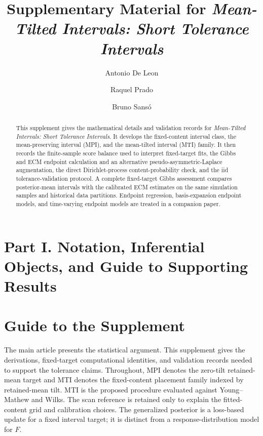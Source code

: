 \documentclass[11pt]{article}
\title{Supplementary Material for \emph{Mean-Tilted Intervals:
Short Tolerance Intervals}}
\author{Antonio De Leon \and Raquel Prado \and Bruno Sans\'o}
\date{}
\begin{document}
\maketitle

\begin{abstract}
\noindent
This supplement gives the mathematical details and validation records for
\emph{Mean-Tilted Intervals: Short Tolerance Intervals}. It develops the
fixed-content interval class, the mean-preserving interval (MPI), and the
mean-tilted interval (MTI) family. It then records the finite-sample score
balance used to interpret fixed-target fits, the Gibbs and ECM endpoint
calculation and an alternative pseudo-asymmetric-Laplace augmentation, the direct
Dirichlet-process content-probability check, and the iid tolerance-validation
protocol. A complete fixed-target Gibbs assessment compares posterior-mean
intervals with the calibrated ECM estimates on the same simulation samples
and historical data partitions. Endpoint regression, basis-expansion endpoint
models, and time-varying endpoint models are treated in a companion paper.
\end{abstract}

\section*{Part I. Notation, Inferential Objects, and Guide to Supporting Results}

\section{Guide to the Supplement}
\label{sec:supp-guide}

The main article presents the statistical argument. This supplement gives the
derivations, fixed-target computational identities, and validation
records needed to support the tolerance claims. Throughout, MPI denotes the
zero-tilt retained-mean target and MTI denotes the fixed-content placement
family indexed by retained-mean tilt. MTI is the proposed procedure evaluated
against Young--Mathew and Wilks. The scan reference is retained only to explain
the fitted-content grid and calibration choices. The generalized posterior is a loss-based update
for a fixed interval target; it is distinct from a response-distribution model
for \(F\).
\end{document}
